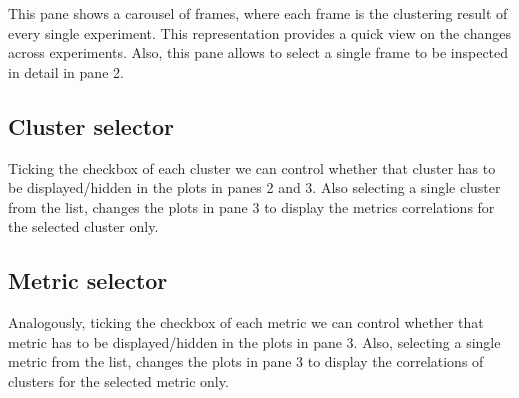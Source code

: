 \documentclass[twoside,a4,english,11pt]{book}
\begin{document}
This pane shows a carousel of frames, where each frame is the clustering result of every single experiment. This representation 
provides a quick view on the changes across experiments. Also, this pane allows to select a single frame to be inspected in 
detail in pane 2.

\subsection{Cluster selector}

Ticking the checkbox of each cluster we can control whether that cluster has to be displayed/hidden in the plots in panes 2 and 3. Also
selecting a single cluster from the list, changes the plots in pane 3 to display the metrics correlations for the selected cluster only.

\subsection{Metric selector}

Analogously, ticking the checkbox of each metric we can control whether that metric has to be displayed/hidden in the plots in pane 3. 
Also, selecting a single metric from the list, changes the plots in pane 3 to display the correlations of clusters for the selected metric only.



\end{document}
